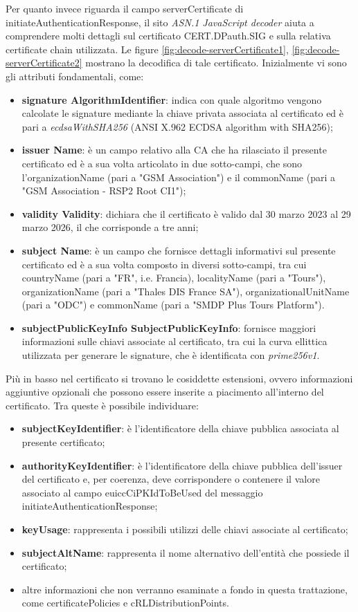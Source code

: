 \documentclass[10pt, oneside]{book}
\begin{document}
Per quanto invece riguarda il campo serverCertificate di initiateAuthenticationResponse, il sito \textit{ASN.1 JavaScript decoder} aiuta a comprendere molti dettagli sul certificato CERT.DPauth.SIG e sulla relativa certificate chain utilizzata. Le figure \ref{fig:decode-serverCertificate1}, \ref{fig:decode-serverCertificate2} mostrano la decodifica di tale certificato. Inizialmente vi sono gli attributi fondamentali, come:
\begin{itemize}
\item \textbf{signature AlgorithmIdentifier}: indica con quale algoritmo vengono calcolate le signature mediante la chiave privata associata al certificato ed è pari a \textit{ecdsaWithSHA256} (ANSI X.962 ECDSA algorithm with SHA256);
\item \textbf{issuer Name}: è un campo relativo alla CA che ha rilasciato il presente certificato ed è a sua volta articolato in due sotto-campi, che sono l'organizationName (pari a "GSM Association") e il commonName (pari a "GSM Association - RSP2 Root CI1");
\item \textbf{validity Validity}: dichiara che il certificato è valido dal 30 marzo 2023 al 29 marzo 2026, il che corrisponde a tre anni;
\item \textbf{subject Name}: è un campo che fornisce dettagli informativi sul presente certificato ed è a sua volta composto in diversi sotto-campi, tra cui countryName (pari a "FR", i.e. Francia), localityName (pari a "Tours"), organizationName (pari a "Thales DIS France SA"), organizationalUnitName (pari a "ODC") e commonName (pari a "SMDP Plus Tours Platform").
\item \textbf{subjectPublicKeyInfo SubjectPublicKeyInfo}: fornisce maggiori informazioni sulle chiavi associate al certificato, tra cui la curva ellittica utilizzata per generare le signature, che è identificata con \textit{prime256v1}.
\end{itemize}
Più in basso nel certificato si trovano le cosiddette estensioni, ovvero informazioni aggiuntive opzionali che possono essere inserite a piacimento all'interno del certificato. Tra queste è possibile individuare:
\begin{itemize}
\item \textbf{subjectKeyIdentifier}: è l'identificatore della chiave pubblica associata al presente certificato;
\item \textbf{authorityKeyIdentifier}: è l'identificatore della chiave pubblica dell'issuer del certificato e, per coerenza, deve corrispondere o contenere il valore associato al campo euiccCiPKIdToBeUsed del messaggio initiateAuthenticationResponse;
\item \textbf{keyUsage}: rappresenta i possibili utilizzi delle chiavi associate al certificato;
\item \textbf{subjectAltName}: rappresenta il nome alternativo dell'entità che possiede il certificato;
\item altre informazioni che non verranno esaminate a fondo in questa trattazione, come certificatePolicies e cRLDistributionPoints.
\end{itemize}
\end{document}
